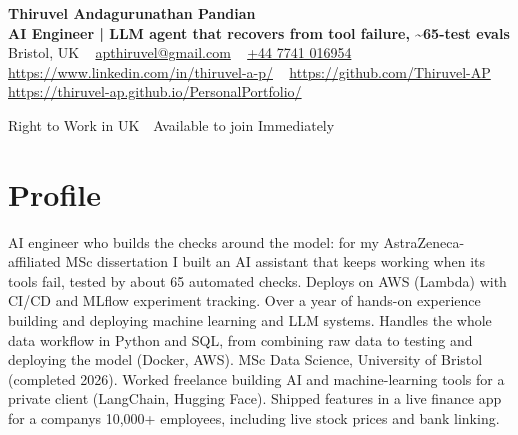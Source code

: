 \documentclass[a4paper,11pt]{article}
\begin{document}
\begin{center}
  {\LARGE\bfseries Thiruvel Andagurunathan Pandian} \\[3pt]
  {\color{headernavy}\small\textbf{AI Engineer | LLM agent that recovers from tool failure, \textasciitilde{}65-test evals}} \\[3pt]
  {\small
  Bristol, UK\nobreak\ \,\textbar\, \href{mailto:apthiruvel@gmail.com}{apthiruvel@gmail.com}\nobreak\ \,\textbar\, \href{tel:+447741016954}{+44 7741 016954}\nobreak\ \,\textbar\, \href{https://www.linkedin.com/in/thiruvel-a-p/}{https://www.linkedin.com/in/thiruvel-a-p/}\nobreak\ \,\textbar\, \href{https://github.com/Thiruvel-AP}{https://github.com/Thiruvel-AP}\nobreak\ \,\textbar\, \href{https://thiruvel-ap.github.io/PersonalPortfolio/}{https://thiruvel-ap.github.io/PersonalPortfolio/}}\par\vspace{4pt}
  \noindent{} Right to Work in UK \,\textbar\, Available to join Immediately
\end{center}

\section{Profile}
AI engineer who builds the checks around the model: for my AstraZeneca-affiliated MSc dissertation I built an AI assistant that keeps working when its tools fail, tested by about 65 automated checks. Deploys on AWS (Lambda) with CI/CD and MLflow experiment tracking. Over a year of hands-on experience building and deploying machine learning and LLM systems. Handles the whole data workflow in Python and SQL, from combining raw data to testing and deploying the model (Docker, AWS). MSc Data Science, University of Bristol (completed 2026). Worked freelance building AI and machine-learning tools for a private client (LangChain, Hugging Face). Shipped features in a live finance app for a company\textquotesingle{}s 10,000+ employees, including live stock prices and bank linking.
\end{document}
